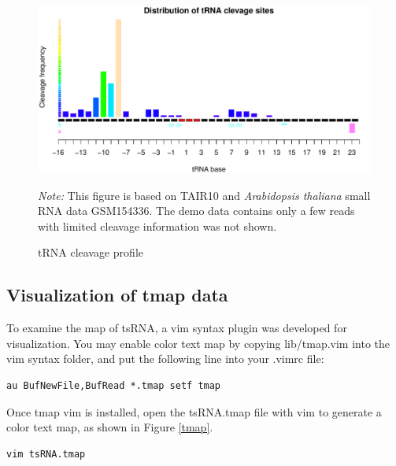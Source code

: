 \documentclass[11pt, a4paper]{article}
\begin{document}
\begin{figure}[htbp]
\begin{center}
\includegraphics[width=13cm]{cleavage_profile.pdf}
\caption{tRNA cleavage profile}
\label{cleavage}
\end{center}
\emph{Note:} This figure is based on TAIR10 and \textit{Arabidopsis thaliana} small RNA data GSM154336. The demo data contains only a few reads with limited cleavage information was not shown.
\end{figure}

\subsection{Visualization of tmap data}

To examine the map of tsRNA, a vim syntax plugin was developed for visualization. You may enable color text map by copying lib/tmap.vim into the vim syntax folder, and put the following line into your .vimrc file:

{\footnotesize \begin{tcolorbox}[colback=blue!5!white,colframe=blue!75!black,title=Set filetype tmap in vim]
\begin{verbatim}
au BufNewFile,BufRead *.tmap setf tmap
\end{verbatim}
\end{tcolorbox}}

Once tmap vim is installed, open the tsRNA.tmap file with vim to generate a color text map, as shown in Figure \ref{tmap}.

{\footnotesize \begin{tcolorbox}[colback=blue!5!white,colframe=blue!75!black,title=Visualization tsRNA.tmap]
\begin{verbatim}
vim tsRNA.tmap
\end{verbatim}
\end{tcolorbox}}
\end{document}
